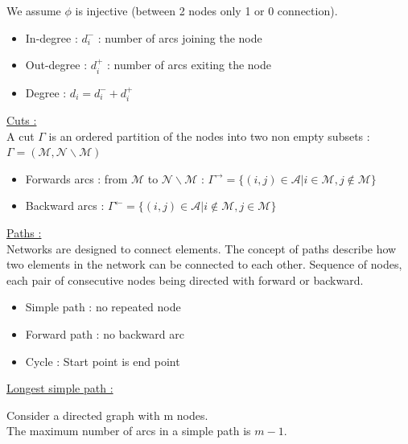 \documentclass[../main.tex]{subfiles}
\begin{document}
We assume $\phi$ is injective (between 2 nodes only 1 or 0 connection).\\

\begin{itemize}
    \item In-degree : $d_i^-$ : number of arcs joining the node\\
    \item Out-degree : $d_i^+$ : number of arcs exiting the node\\
    \item Degree : $d_i = d_i^-+d_i^+$\\
\end{itemize}

\quad \underline{Cuts :}\\
A cut $\Gamma$ is an ordered partition of the nodes into two non empty subsets : $\Gamma = (\mathcal{M}, \mathcal{N}\backslash \mathcal{M})$\\

\begin{itemize}
    \item Forwards arcs : from $\mathcal{M}$ to $\mathcal{N}\backslash \mathcal{M}$ : $\Gamma^\rightarrow = \{(i,j) \in \mathcal{A} \lvert i \in \mathcal{M}, j \notin \mathcal{M}\}$\\
    \item Backward arcs : $\Gamma^\leftarrow = \{(i,j) \in \mathcal{A} \lvert i \notin \mathcal{M}, j \in \mathcal{M}\}$\\
\end{itemize}

\quad \underline{Paths :}\\
Networks are designed to connect elements. The concept of paths describe how two elements in the network can be connected to each other. Sequence of nodes, each pair of consecutive nodes being directed with forward or backward.\\

\begin{itemize}
    \item Simple path : no repeated node\\
    \item Forward path : no backward arc\\
    \item Cycle : Start point is end point\\
\end{itemize}

\quad \underline{Longest simple path :}\\
\begin{theoremen}
    Consider a directed graph with m nodes.\\
    The maximum number of arcs in a simple path is $m-1$.\\
\end{theoremen}
\end{document}
